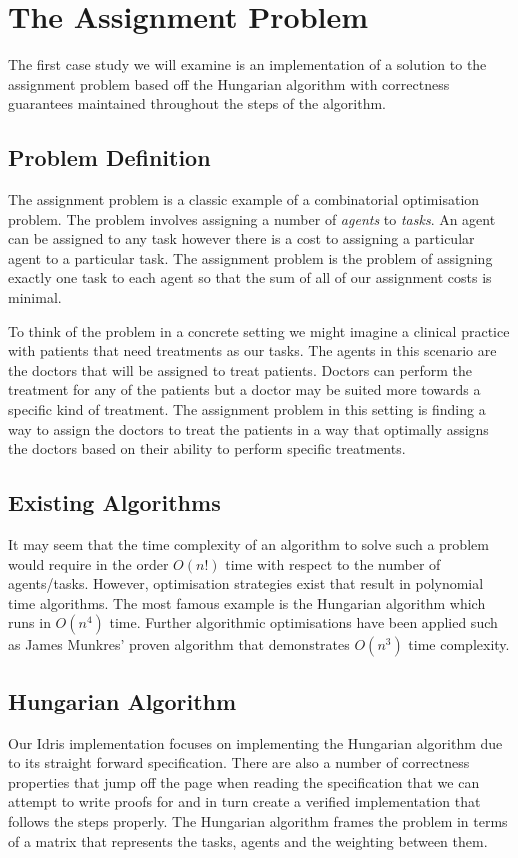 \documentclass[a4paper, notitlepage]{report}
\begin{document}
\section{The Assignment Problem}
\label{sec:org03a52eb}
The first case study we will examine is an implementation of a solution to the
assignment problem based off the Hungarian algorithm with correctness guarantees
maintained throughout the steps of the algorithm.

\subsection{Problem Definition}
\label{sec:org5b07d14}
The assignment problem is a classic example of a combinatorial optimisation
problem. The problem involves assigning a number of \emph{agents} to \emph{tasks}. An agent
can be assigned to any task however there is a cost to assigning a particular
agent to a particular task. The assignment problem is the problem of assigning
exactly one task to each agent so that the sum of all of our assignment costs is
minimal.

To think of the problem in a concrete setting we might imagine a clinical
practice with patients that need treatments as our tasks. The agents in this
scenario are the doctors that will be assigned to treat patients. Doctors can
perform the treatment for any of the patients but a doctor may be suited more
towards a specific kind of treatment. The assignment problem in this setting is
finding a way to assign the doctors to treat the patients in a way that
optimally assigns the doctors based on their ability to perform specific
treatments.

\subsection{Existing Algorithms}
\label{sec:org2e56a3a}
It may seem that the time complexity of an algorithm to solve such a problem
would require in the order \(O(n!)\) time with respect to the number of
agents/tasks. However, optimisation strategies exist that result in polynomial
time algorithms. The most famous example is the Hungarian algorithm which runs
in \(O(n^4)\) time. Further algorithmic optimisations have been applied such as
James Munkres' proven algorithm \cite{munkres_assignment_1957} that demonstrates
\(O(n^3)\) time complexity.

\subsection{Hungarian Algorithm}
\label{sec:org9d227f0}
Our Idris implementation focuses on implementing the Hungarian algorithm due to
its straight forward specification. There are also a number of correctness
properties that jump off the page when reading the specification that we can
attempt to write proofs for and in turn create a verified implementation that
follows the steps properly. The Hungarian algorithm frames the problem in terms
of a matrix that represents the tasks, agents and the weighting between them.
\end{document}
